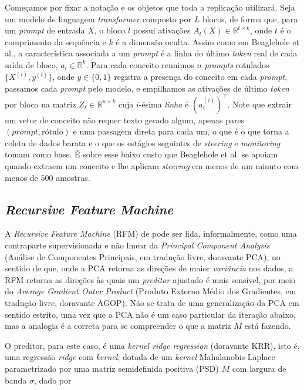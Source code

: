 Começamos por fixar a notação e os objetos que toda a replicação utilizará. Seja um modelo
de linguagem \textit{transformer} composto por $L$ blocos, de forma que, para um
\textit{prompt} de entrada $X$, o bloco $l$ possui ativações
$A_l(X) \in \mathbb{R}^{t \times k }$, onde $t$ é o comprimento da sequência e $k$ é a
dimensão oculta. Assim como em Beaglehole et al., a característica associada a um
\textit{prompt} é a linha do último \textit{token} real de cada saída de bloco,
$a_l \in \mathbb{R}^k$. Para cada conceito reunimos $n$ \textit{prompts} rotulados
$\{X^{(i)}, y^{(i)}\}$, onde $y \in \{0,1\}$ registra a presença do conceito em cada
\textit{prompt}, passamos cada \textit{prompt} pelo modelo, e empilhamos as ativações de
último \textit{token} por bloco na matriz $Z_\ell \in \mathbb{R}^{n \times k}$ cuja
$i$-ésima \emph{linha} é $\left(a_\ell^{(i)}\right)^{\top}$. Note que extrair um vetor de
conceito não requer texto gerado algum, apenas pares
$(\textit{prompt}, \text{rótulo})$ e uma passagem direta para cada um, o que é o que torna
a coleta de dados barata e o que os estágios seguintes de \textit{steering} e \textit{monitoring}
tomam como base. É sobre esse baixo custo que Beaglehole et al. se apoiam quando extraem um
conceito e lhe aplicam \textit{steering} em menos de um minuto com menos de $500$ amostras.

\subsection{\textit{Recursive Feature Machine}}

A \textit{Recursive Feature Machine} (RFM) de \cite{radhakrishnan2024mechanism} pode ser
lida, informalmente, como uma contraparte supervisionada e não linear da
\textit{Principal Component Analysis} (Análise de Componentes Principais, em tradução
livre, doravante PCA), no sentido
de que, onde a PCA retorna as direções de maior \emph{variância} nos dados, a RFM retorna
as direções às quais um \emph{preditor} ajustado é mais sensível, por meio do
\textit{Average Gradient Outer Product} (Produto Externo Médio dos Gradientes, em tradução
livre, doravante AGOP).
Não se trata de uma generalização da PCA em sentido estrito, uma vez que a PCA não é um
caso particular da iteração abaixo, mas a analogia é a correta para se compreender o que a
matriz $M$ está fazendo.

O preditor, para este caso, é uma \textit{kernel ridge regression} (doravante KRR), isto é,
uma regressão \textit{ridge} com \textit{kernel}, dotada de um \textit{kernel}
Mahalanobis-Laplace parametrizado por uma matriz semidefinida positiva (PSD) $M$ com
largura de banda $\sigma$, dado por

